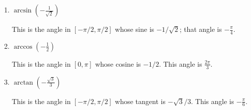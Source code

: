 \documentclass{article}
\begin{document}
\begin{warmup}
\begin{enumerate}[topsep=0pt,label=W\arabic*., ref=\#W\arabic*]
{\begin{enumerate}
    \item
    \begin{problem}
        $\arcsin(-\frac{1}{\sqrt2})$
    \end{problem}
    \pspace{0.4in}

    \begin{solution}
        This is the angle in $[-\pi/2,\pi/2]$ whose sine is $-1/\sqrt2$;
        that angle is $\boxed{-\frac{\pi}{4}}$.
    \end{solution}

    \item
    \begin{problem}
        $\arccos(-\frac{1}{2})$
    \end{problem}
    \pspace{0.4in}

    \begin{solution}
        This is the angle in $[0,\pi]$ whose cosine is $-1/2$.
        This angle is $\boxed{\frac{2\pi}{3}}$.
    \end{solution}

    \item
    \begin{problem}
        $\arctan(-\frac{\sqrt3}{3})$
    \end{problem}

    \begin{solution}
        This is the angle in $[-\pi/2,\pi/2]$ whose tangent is $-\sqrt3/3$.
        This angle is  $\boxed{-\frac{\pi}{6}}$.
    \end{solution}

      \end{enumerate}    
}

  \end{enumerate}
  \pspace{0.6in}

  \vspace{4pt}
\end{warmup}
\pspace{\newpage}
\end{document}
